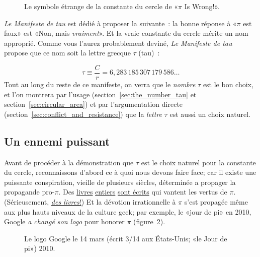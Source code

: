 \begin{figure}
\caption{Le symbole étrange de la constante du cercle de «\ns $\pi$ Is Wrong!\ns ».\label{fig:palais_tau}}
\end{figure}

\emph{Le Manifeste de tau} est dédié à proposer la suivante~:  la bonne
réponse à «\ns $\pi$ est faux\ns » est «\ns Non, mais \emph{vraiment}\ns ». Et la vraie
constante du cercle mérite un nom approprié. Comme vous l'aurez probablement deviné,
\emph{Le Manifeste de tau} propose que ce nom soit la lettre grecque $\tau$
(tau)~:

\begin{equation}
\label{eq:tau}
\tau \equiv \frac{C}{r} = 6{,}283\,185\,307\,179\,586\ldots
\end{equation}
Tout au long du reste de ce manifeste, on verra que le \emph{nombre} $\tau$ est
le bon choix, et l'on montrera par l'usage (section~\ref{sec:the_number_tau}
et section~\ref{sec:circular_area}) et par l'argumentation directe
(section~\ref{sec:conflict_and_resistance}) que la \emph{lettre} $\tau$ est aussi
un choix naturel.

\subsection{Un ennemi puissant} %
 \label{sec:a_powerful_enemy}
 
Avant de procéder à la démonstration que $\tau$ est le choix naturel pour la
constante du cercle, reconnaissons d'abord ce à quoi nous devons faire face\ns; car il existe
une puissante conspiration, vieille de plusieurs siècles, déterminée a propager
la propagande pro-$\pi$. Des
\href{https://www.amazon.fr/fascinant-nombre-ESSAIS-SCIEN-ebook/dp/B07D3SYP5X/}{livres}
\href{https://www.amazon.fr/1-000-000-Décimales-Nombre-Plus-Connu/dp/B085DMM9XV/}{entiers}
\href{https://www.amazon.fr/Autour-du-nombre-pi-HR-ACT-SC-INDUS-ebook/dp/B081HGQSQJ/}{sont
écrits} qui vantent les vertus de $\pi$. (Sérieusement,
\href{https://www.amazon.com/exec/obidos/ISBN=0802713327/}{\emph{des
livres}\ns!}) Et la dévotion irrationnelle à $\pi$ s'est propagée même aux
plus hauts niveaux de la culture geek\ns; par exemple, le «\ns jour de pi\ns » en 2010,
\href{https://www.google.com/}{Google} \emph{a changé son logo} pour honorer
$\pi$ (figure~\ref{fig:google_pi_day.}).

\begin{figure}
\begin{center}
\end{center}
\caption{Le logo Google le 14 mars (écrit 3/14 aux États-Unis\ns; «\ns le Jour de
pi\ns ») 2010.\label{fig:google_pi_day.}}
\end{figure}

